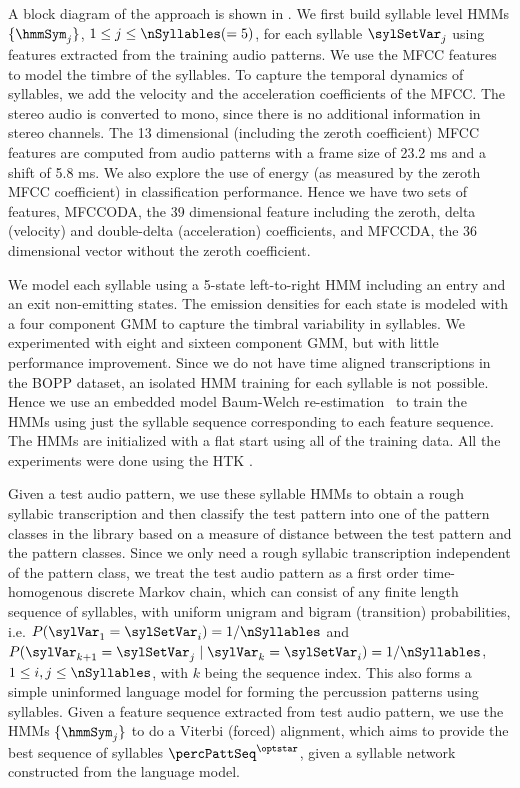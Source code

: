 A block diagram of the approach is shown in . We first build syllable level \glspl{HMM} $\{\hmmSym_j\}$, $1 \leq j \leq \nSyllables (= 5)$, for each syllable $\sylSetVar_j$ using features extracted from the training audio patterns. We use the \gls{MFCC} features to model the timbre of the syllables. To capture the temporal dynamics of syllables, we add the velocity and the acceleration coefficients of the \gls{MFCC}. The stereo audio is converted to mono, since there is no additional information in stereo channels. The 13 dimensional (including the zeroth coefficient) \gls{MFCC} features are computed from audio patterns with a frame size of 23.2 ms and a shift of 5.8 ms. We also explore the use of energy (as measured by the zeroth \gls{MFCC} coefficient) in classification performance. Hence we have two sets of features, \acrshort{MFCCODA}, the 39 dimensional feature including the zeroth, delta (velocity) and double-delta (acceleration) coefficients, and \acrshort{MFCCDA}, the 36 dimensional vector without the zeroth coefficient. 

We model each syllable using a 5-state left-to-right \gls{HMM} including an entry and an exit non-emitting states. The emission densities for each state is modeled with a four component \gls{GMM} to capture the timbral variability in syllables. We experimented with eight and sixteen component \gls{GMM}, but with little performance improvement. Since we do not have time aligned transcriptions in the \acrshort{BOPP} dataset, an isolated \gls{HMM} training for each syllable is not possible. Hence we use an embedded model Baum-Welch re-estimation~\cite{huang:90:hmm} to train the \glspl{HMM} using just the syllable sequence corresponding to each feature sequence. The \glspl{HMM} are initialized with a flat start using all of the training data. All the experiments were done using the \acrfull{HTK} \cite{young:06:htkbook}. 

Given a test audio pattern, we use these syllable \glspl{HMM} to obtain a rough syllabic transcription and then classify the test pattern into one of the pattern classes in the library based on a measure of distance between the test pattern and the pattern classes. Since we only need a rough syllabic transcription independent of the pattern class, we treat the test audio pattern as a first order time-homogenous discrete Markov chain, which can consist of any finite length sequence of syllables, with uniform unigram and bigram (transition) probabilities, i.e. $P(\sylVar_1 = \sylSetVar_i) = 1/\nSyllables$ and $P(\sylVar_{k+1} = \sylSetVar_j \mid \sylVar_k = \sylSetVar_i) = 1/\nSyllables$, $ 1 \leq i,j \leq \nSyllables$, with $k$ being the sequence index. This also forms a simple uninformed language model for forming the percussion patterns using syllables. Given a feature sequence extracted from test audio pattern, we use the \glspl{HMM} $\{\hmmSym_j\}$ to do a Viterbi (forced) alignment, which aims to provide the best sequence of syllables $\percPattSeq^{\optstar}$, given a syllable network constructed from the language model. 

